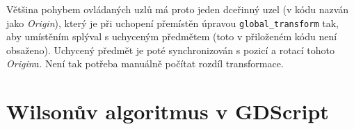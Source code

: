 \documentclass[12pt]{report}
\begin{document}
Většina pohybem ovládaných uzlů má proto jeden dceřinný uzel (v kódu nazván jako \textit{Origin}), který je při uchopení přemístěn úpravou \texttt{global\_transform} tak, aby umístěním splýval s uchyceným předmětem (toto v přiloženém kódu není obsaženo). Uchycený předmět je poté synchronizován s pozicí a rotací tohoto \textit{Origin}u. Není tak potřeba manuálně počítat rozdíl transformace.



\chapter{Wilsonův algoritmus v GDScript}\label{apx_mazegen}

\end{document}
